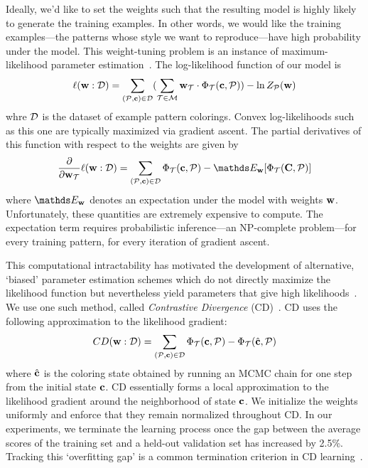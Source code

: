 Ideally, we'd like to set the weights such that the resulting model is highly likely to generate the training examples. In other words, we would like the training examples---the patterns whose style we want to reproduce---have high probability under the model. This weight-tuning problem is an instance of maximum-likelihood parameter estimation~\cite{PGMBook}. The log-likelihood function of our model is
\begin{equation*}
\ell(\mathbf{w} : \mathcal{D}) =
	\sum_{(\mathcal{P}, \mathbf{c}) \in \mathcal{D}}
	(
		\sum_{\mathcal{T} \in \mathcal{M}}
			\mathbf{w}_{\mathcal{T}} \cdot \Phi_{\mathcal{T}}(\mathbf{c}, \mathcal{P})
	)			
		- \ln{Z_{\mathcal{P}}(\mathbf{w})}
\end{equation*}
whre $\mathcal{D}$ is the dataset of example pattern colorings. Convex log-likelihoods such as this one are typically maximized via gradient ascent. The partial derivatives of this function with respect to the weights are given by
\begin{equation*}
\frac{\partial}{\partial \weights_\term} \ell(\weights : \dataset) = 
	\sum_{(\pattern, \colors) \in \dataset}
			\termStats(\colors, \pattern)
		- \expectation_\weights[\termStats(\colorVars, \pattern)]
\end{equation*}
where $\expectation_\weights$ denotes an expectation under the model with weights $\mathbf{w}$. Unfortunately, these quantities are extremely expensive to compute. The expectation term requires probabilistic inference---an NP-complete problem---for every training pattern, for every iteration of gradient ascent.

This computational intractability has motivated the development of alternative, `biased' parameter estimation schemes which do not directly maximize the likelihood function but nevertheless yield parameters that give high likelihoods~\cite{NonMLEParameterEstimation}. We use one such method, called \emph{Contrastive Divergence} (CD)~\cite{ContrastiveDivergence}. CD uses the following approximation to the likelihood gradient:
\begin{equation*}
CD(\mathbf{w} : \mathcal{D}) = 
	\sum_{(\mathcal{P}, \mathbf{c}) \in \mathcal{D}}
			\Phi_{\mathcal{T}}(\mathbf{c}, \mathcal{P})
		 -\Phi_{\mathcal{T}}(\hat{\mathbf{c}}, \mathcal{P})
\end{equation*}
where $\hat{\mathbf{c}}$ is the coloring state obtained by running an MCMC chain for one step from the initial state $\mathbf{c}$. CD essentially forms a local approximation to the likelihood gradient around the neighborhood of state $\mathbf{c}$.
We initialize the weights uniformly and enforce that they remain normalized throughout CD. In our experiments, we terminate the learning process once the gap between the average scores of the training set and a held-out validation set has increased by 2.5\%. Tracking this `overfitting gap' is a common termination criterion in CD learning~\cite{CDTipsAndTricks}.


